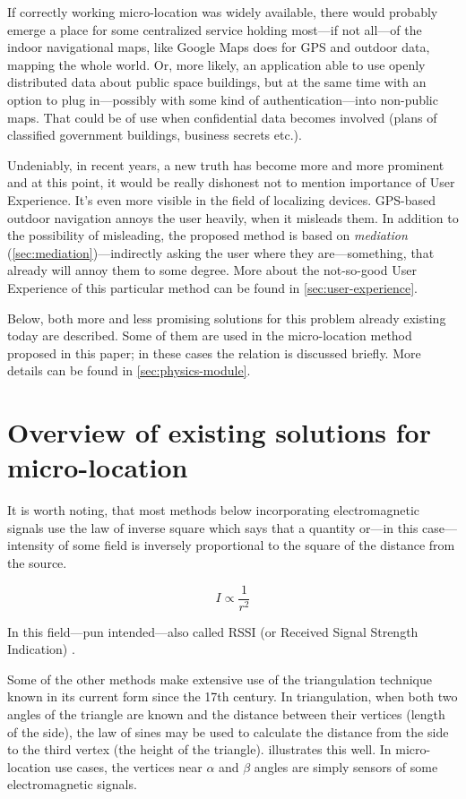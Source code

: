 If correctly working micro-location was widely available, there would probably emerge a place for some centralized service holding most---if not all---of the indoor navigational maps, like Google Maps does for GPS and outdoor data, mapping the whole world. Or, more likely, an application able to use openly distributed data about public space buildings, but at the same time with an option to plug in---possibly with some kind of authentication---into non-public maps. That could be of use when confidential data becomes involved (plans of classified government buildings, business secrets etc.).

Undeniably, in recent years, a new truth has become more and more prominent and at this point, it would be really dishonest not to mention importance of User Experience. It's even more visible in the field of localizing devices. GPS-based outdoor navigation annoys the user heavily, when it misleads them. In addition to the possibility of misleading, the proposed method is based on \emph{mediation} (\cref{sec:mediation})---indirectly asking the user where they are---something, that already will annoy them to some degree. More about the not-so-good User Experience of this particular method can be found in \cref{sec:user-experience}.

Below, both more and less promising solutions for this problem already existing today are described. Some of them are used in the micro-location method proposed in this paper; in these cases the relation is discussed briefly. More details can be found in \cref{sec:physics-module}.

\section{Overview of existing solutions for micro-location}
\label{sec:existing-uloc}

It is worth noting, that most methods below incorporating electromagnetic signals use the law of inverse square which says that a quantity or---in this case---intensity of some field is inversely proportional to the square of the distance from the source.

\begin{equation}
	\label{eq:inverse-sq}
	I \propto \frac{1}{r^2}
\end{equation}

In this field---pun intended---also called RSSI (or Received Signal Strength Indication) \cite{Gough:RSSI}.

Some of the other methods make extensive use of the triangulation technique known in its current form since the 17th century. In triangulation, when both two angles of the triangle are known and the distance between their vertices (length of the side), the law of sines may be used to calculate the distance from the side to the third vertex (the height of the triangle).  illustrates this well. In micro-location use cases, the vertices near $\alpha$ and $\beta$ angles are simply sensors of some electromagnetic signals.

